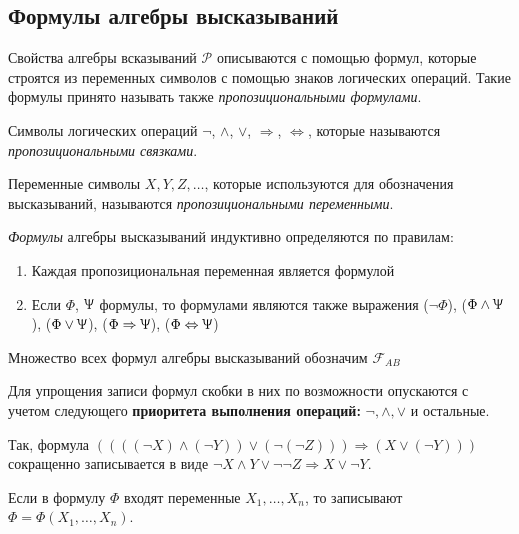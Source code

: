 \subsection*{Формулы алгебры высказываний}
\begin{definition}
    Свойства алгебры всказываний $\mathscr{P}$ описываются с помощью формул, которые строятся из переменных символов с помощью знаков логических операций. Такие формулы принято называть также \textit{пропозициональными формулами}.
\end{definition}

\begin{definition}
    Символы логических операций $\lnot$, $\land$, $\lor$, $\Rightarrow$, $\Leftrightarrow$, которые называются \textit{пропозициональными связками}.
\end{definition}

\begin{definition}
    Переменные символы $X, Y, Z,\dots$, которые используются для обозначения высказываний, называются \textit{пропозициональными переменными}.
\end{definition}

\begin{definition}
    \textit{Формулы} алгебры высказываний индуктивно определяются по правилам:

    \begin{enumerate}
        \item Каждая пропозициональная переменная является формулой
        \item Если $\Phi$, $\Uppsi$  формулы, то формулами являются также выражения
        ($\lnot\Phi$), ($\Phi\land\Uppsi$), ($\Phi\lor\Uppsi$), ($\Phi\Rightarrow\Uppsi$), ($\Phi\Leftrightarrow\Uppsi$)
    \end{enumerate}

Множество всех формул алгебры высказываний обозначим $\mathcal{F}_{AB}$
\end{definition}

Для упрощения записи формул скобки в них по возможности опускаются с учетом следующего \textbf{приоритета выполнения операций:} $\lnot, \land, \lor$ и остальные.

Так, формула $((((\lnot X)\land (\lnot Y))\lor(\lnot(\lnot Z)))\Rightarrow(X \lor (\lnot Y)))$
сокращенно записывается в виде $\lnot X \land Y \lor \lnot\lnot Z \Rightarrow X \lor \lnot Y$.

Если в формулу $\Phi$ входят переменные $X_1, \dots, X_n$, то записывают $\Phi = \Phi(X_1,\dots,X_n)$.

